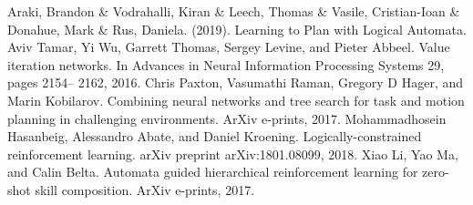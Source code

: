 \documentclass[letterpaper, 10 pt, conference]{ieeeconf}  %
\begin{document}
\begin{thebibliography}{99}

 Araki, Brandon \& Vodrahalli, Kiran \& Leech, Thomas \& Vasile, Cristian-Ioan \& Donahue, Mark \& Rus, Daniela. (2019). Learning to Plan with Logical Automata.
 Aviv Tamar, Yi Wu, Garrett Thomas, Sergey Levine, and Pieter Abbeel. Value iteration networks. In Advances in Neural Information Processing Systems 29, pages 2154– 2162, 2016.
 Chris Paxton, Vasumathi Raman, Gregory D Hager, and Marin Kobilarov. Combining neural networks and tree search for task and motion planning in challenging environments. ArXiv e-prints, 2017.
 Mohammadhosein Hasanbeig, Alessandro Abate, and Daniel Kroening. Logically-constrained reinforcement learning. arXiv preprint arXiv:1801.08099, 2018.
 Xiao Li, Yao Ma, and Calin Belta. Automata guided hierarchical reinforcement learning for zero-shot skill composition. ArXiv e-prints, 2017.


\end{thebibliography}
\end{document}
